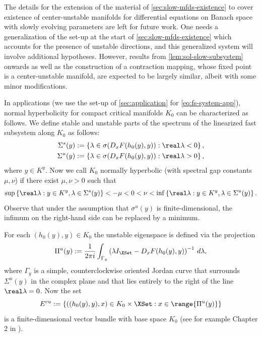 \documentclass[a4paper]{siamart190516}
\begin{document}
 The details for the extension of the material of \cref{sec:slow-mfds-existence} to cover existence of center-unstable manifolds for differential equations on Banach space with slowly evolving parameters are left for future work. One needs a generalization of the set-up at the start of \cref{sec:slow-mfds-existence} which accounts for the presence of unstable directions, and this generalized system will involve additional hypotheses. However, results from \cref{lem:sol-slow-subsystem} onwards as well as the construction of a contraction mapping, whose fixed point is a center-unstable manifold, are expected to be largely similar, albeit with some minor modifications. 
 
 In applications (we use the set-up of \cref{sec:application} for \cref{eq:fs-system-app}), normal hyperbolicity for compact critical manifolds $K_0$ can be characterized as follows. We define stable and unstable parts of the spectrum of the linearized fast subsystem along $K_0$ as follows:
 \begin{align*}
 \Sigma^s(y) &:= \left\{ \lambda \in \sigma(D_x F(h_0(y),y)) : \real \lambda < 0 \right\}, \\
 \Sigma^u(y) &:= \left\{ \lambda \in \sigma(D_x F(h_0(y),y)) : \real \lambda > 0 \right\},
 \end{align*}
 where $y \in K^y$. Now we call $K_0$ normally hyperbolic (with spectral gap constants $\mu,\nu$)  if there exist $\mu, \nu > 0$ such that
 \[
 \sup \left\{\real \lambda : y \in K^y, \lambda \in \Sigma^s(y) \right\} < -\mu < 0 < \nu <   \inf \left\{ \real \lambda : y \in K^y, \lambda \in \Sigma^u(y) \right\}.
 \]
 Observe that under the assumption that $\sigma^u(y)$ is finite-dimensional, the infimum on the right-hand side can be replaced by a minimum. 
 
 For each $(h_0(y),y) \in K_0$ the unstable eigenspace is defined via the projection
 \[
 \Pi^{u}(y) := \frac{1}{2\pi i} \int_{\Gamma_y} \left(\lambda I_{\XSet} - D_x F(h_0(y),y)  \right)^{-1} \, d\lambda,
 \]
 where $\Gamma_y$ is a simple, counterclockwise oriented Jordan curve that surrounds $\Sigma^u(y)$ in the complex plane and that lies entirely to the right of the line $\real \lambda = 0$. Now the set
 \[
E^{cu} := \{ ((h_0(y),y), x) \in K_0 \times \XSet : x \in \range{\Pi^u(y)} \}
 \]
 is a finite-dimensional vector bundle with base space $K_0$ (see for example Chapter 2 in \cite{El12}). 
 
\end{document}
